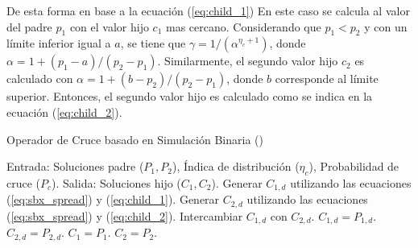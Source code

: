 De esta forma en base a la ecuación (\ref{eq:child_1}) En este caso se calcula al valor del padre $p_1$ con el valor hijo $c_1$ mas cercano.
%
Considerando que $p_1 < p_2$ y con un límite inferior igual a $a$, se tiene que $\gamma = 1/(\alpha^{\eta_c + 1})$, donde $\alpha = 1 + (p_1 - a) / (p_2 - p_1)$.
%
Similarmente, el segundo valor hijo $c_2$ es calculado con $\alpha = 1 + (b-p_2)/(p_2 - p_1)$, donde $b$ corresponde al límite superior.
%
Entonces, el segundo valor hijo es calculado como se indica en la ecuación (\ref{eq:child_2}).

\begin{algorithm}[t]
\scriptsize
\caption{Operador de Cruce basado en Simulación Binaria (\SBX{})}
\label{alg:SBX_Operator}
\begin{algorithmic}[1]
    \STATE Entrada: Soluciones padre ($P_{1}, P_{2}$), Índica de distribución ($\eta_c$), Probabilidad de cruce ($P_c$).
    \STATE Salida: Soluciones hijo ($C_{1}, C_{2}$).
	 \label{alg:inherit_variable}
		\STATE Generar $C_{1,d}$ utilizando las ecuaciones (\ref{eq:sbx_spread}) y (\ref{eq:child_1}).
		\STATE Generar $C_{2,d}$ utilizando las ecuaciones (\ref{eq:sbx_spread}) y (\ref{eq:child_2}).
			\STATE Intercambiar $C_{1,d}$ con $C_{2,d}$.
		 \ENDIF
        \ELSE
	   \STATE $C_{1,d} = P_{1, d}$.
	   \STATE $C_{2,d} = P_{2, d}$.
        \ENDIF
       \ENDFOR
    \ELSE
	\STATE $C_{1} = P_{1}$.
	\STATE $C_{2} = P_{2}$.
    \ENDIF
\end{algorithmic}
\end{algorithm}

